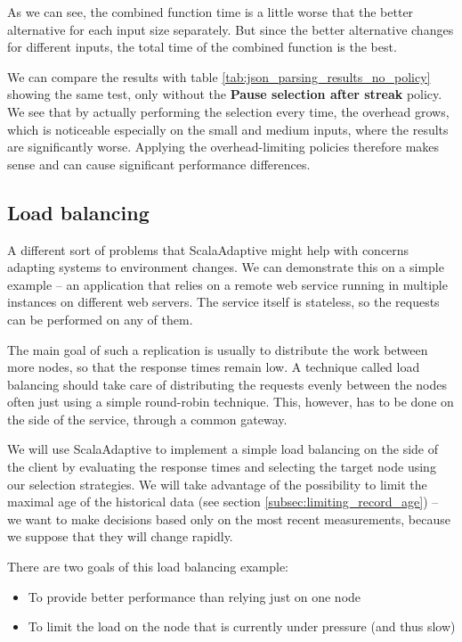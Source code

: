 As we can see, the combined function time is a little worse that the better alternative for each input size separately. But since the better alternative changes for different inputs, the total time of the combined function is the best.

We can compare the results with table \ref{tab:json_parsing_results_no_policy} showing the same test, only without the \textbf{Pause selection after streak} policy. We see that by actually performing the selection every time, the overhead grows, which is noticeable especially on the small and medium inputs, where the results are significantly worse. Applying the overhead-limiting policies therefore makes sense and can cause significant performance differences.

\subsection{Load balancing}

A different sort of problems that ScalaAdaptive might help with concerns adapting systems to environment changes. We can demonstrate this on a simple example -- an application that relies on a remote web service running in multiple instances on different web servers. The service itself is stateless, so the requests can be performed on any of them.

The main goal of such a replication is usually to distribute the work between more nodes, so that the response times remain low. A technique called load balancing should take care of distributing the requests evenly between the nodes often just using a simple round-robin technique. This, however, has to be done on the side of the service, through a common gateway. 

We will use ScalaAdaptive to implement a simple load balancing on the side of the client by evaluating the response times and selecting the target node using our selection strategies. We will take advantage of the possibility to limit the maximal age of the historical data (see section \ref{subsec:limiting_record_age}) -- we want to make decisions based only on the most recent measurements, because we suppose that they will change rapidly.

There are two goals of this load balancing example:

\begin{itemize}
	\item To provide better performance than relying just on one node
	\item To limit the load on the node that is currently under pressure (and thus slow)
\end{itemize}

